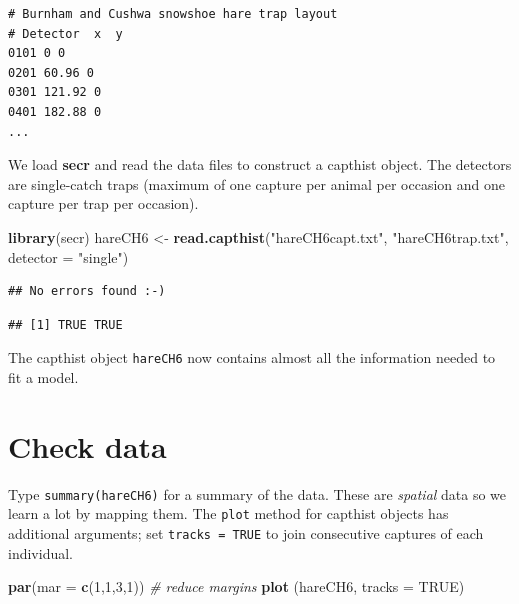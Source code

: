 \documentclass[
]{book}
\newenvironment{Shaded}{\begin{snugshade}}{\end{snugshade}}
\newcommand{\AttributeTok}[1]{\textcolor[rgb]{0.13,0.29,0.53}{#1}}
\newcommand{\CommentTok}[1]{\textcolor[rgb]{0.56,0.35,0.01}{\textit{#1}}}
\newcommand{\ConstantTok}[1]{\textcolor[rgb]{0.56,0.35,0.01}{#1}}
\newcommand{\DecValTok}[1]{\textcolor[rgb]{0.00,0.00,0.81}{#1}}
\newcommand{\FunctionTok}[1]{\textcolor[rgb]{0.13,0.29,0.53}{\textbf{#1}}}
\newcommand{\NormalTok}[1]{#1}
\newcommand{\OtherTok}[1]{\textcolor[rgb]{0.56,0.35,0.01}{#1}}
\newcommand{\StringTok}[1]{\textcolor[rgb]{0.31,0.60,0.02}{#1}}
\begin{document}
\begin{verbatim}
# Burnham and Cushwa snowshoe hare trap layout
# Detector  x  y 
0101 0 0
0201 60.96 0
0301 121.92 0
0401 182.88 0
... 
\end{verbatim}

\vspace{12pt}

We load \textbf{secr} and read the data files to construct a capthist object. The detectors are single-catch traps (maximum of one capture per animal per occasion and one capture per trap per occasion).

\begin{Shaded}
\begin{Highlighting}[]
\FunctionTok{library}\NormalTok{(secr)}
\NormalTok{hareCH6 }\OtherTok{\textless{}{-}} \FunctionTok{read.capthist}\NormalTok{(}\StringTok{"hareCH6capt.txt"}\NormalTok{, }\StringTok{"hareCH6trap.txt"}\NormalTok{, }
                         \AttributeTok{detector =} \StringTok{"single"}\NormalTok{)}
\end{Highlighting}
\end{Shaded}

\begin{verbatim}
## No errors found :-)
\end{verbatim}

\begin{verbatim}
## [1] TRUE TRUE
\end{verbatim}

The capthist object \texttt{hareCH6} now contains almost all the information needed to fit a model.

\section{Check data}\label{check-data}

Type \texttt{summary(hareCH6)} for a summary of the data. These are \emph{spatial} data so we learn a lot by mapping them. The \texttt{plot} method for capthist objects has additional arguments; set \texttt{tracks\ =\ TRUE} to join consecutive captures of each individual.

\begin{Shaded}
\begin{Highlighting}[]
\FunctionTok{par}\NormalTok{(}\AttributeTok{mar =} \FunctionTok{c}\NormalTok{(}\DecValTok{1}\NormalTok{,}\DecValTok{1}\NormalTok{,}\DecValTok{3}\NormalTok{,}\DecValTok{1}\NormalTok{))  }\CommentTok{\# reduce margins}
\FunctionTok{plot}\NormalTok{ (hareCH6, }\AttributeTok{tracks =} \ConstantTok{TRUE}\NormalTok{)}
\end{Highlighting}
\end{Shaded}
\end{document}
